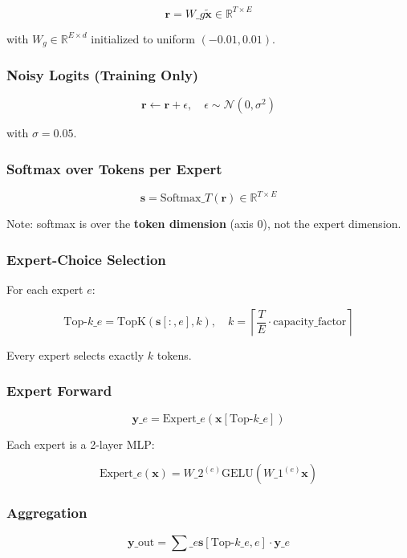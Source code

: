 \[
\mathbf{r} = W\_g \tilde{\mathbf{x}} \in \mathbb{R}^{T \times E}
\tag{4.6}
\]

with $W_g \in \mathbb{R}^{E \times d}$ initialized to uniform $(-0.01, 0.01)$.

\subsubsection{Noisy Logits (Training Only)}

\[
\mathbf{r} \leftarrow \mathbf{r} + \epsilon, \quad \epsilon \sim \mathcal{N}(0, \sigma^2)
\tag{4.7}
\]

with $\sigma = 0.05$.

\subsubsection{Softmax over Tokens per Expert}

\[
\mathbf{s} = \text{Softmax}\_T(\mathbf{r}) \in \mathbb{R}^{T \times E}
\tag{4.8}
\]

Note: softmax is over the \textbf{token dimension} (axis 0), not the expert 
dimension.

\subsubsection{Expert-Choice Selection}

For each expert $e$:

\[
\text{Top-}k\_e = \text{TopK}\!\left(\mathbf{s}[:, e], k\right), \quad
k = \left\lceil \frac{T}{E} \cdot \text{capacity\_factor} \right\rceil
\tag{4.9}
\]

Every expert selects exactly $k$ tokens.

\subsubsection{Expert Forward}

\[
\mathbf{y}\_e = \text{Expert}\_e\!\left(\mathbf{x}[\text{Top-}k\_e]\right)
\tag{4.10}
\]

Each expert is a 2-layer MLP:

\[
\text{Expert}\_e(\mathbf{x}) = W\_2^{(e)} \text{GELU}(W\_1^{(e)} \mathbf{x})
\tag{4.11}
\]

\subsubsection{Aggregation}

\[
\mathbf{y}\_{\text{out}} = \sum\_e \mathbf{s}[\text{Top-}k\_e, e] \cdot \mathbf{y}\_e
\tag{4.12}
\]

